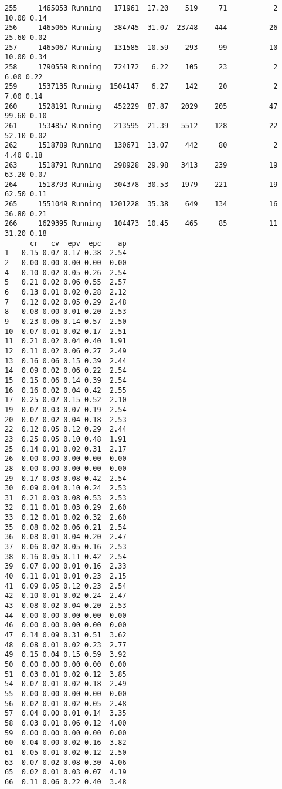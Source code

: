 \documentclass[
]{article}
\begin{document}
\begin{verbatim}
255     1465053 Running   171961  17.20    519     71           2   10.00 0.14
256     1465065 Running   384745  31.07  23748    444          26   25.60 0.02
257     1465067 Running   131585  10.59    293     99          10   10.00 0.34
258     1790559 Running   724172   6.22    105     23           2    6.00 0.22
259     1537135 Running  1504147   6.27    142     20           2    7.00 0.14
260     1528191 Running   452229  87.87   2029    205          47   99.60 0.10
261     1534857 Running   213595  21.39   5512    128          22   52.10 0.02
262     1518789 Running   130671  13.07    442     80           2    4.40 0.18
263     1518791 Running   298928  29.98   3413    239          19   63.20 0.07
264     1518793 Running   304378  30.53   1979    221          19   62.50 0.11
265     1551049 Running  1201228  35.38    649    134          16   36.80 0.21
266     1629395 Running   104473  10.45    465     85          11   31.20 0.18
      cr   cv  epv  epc    ap
1   0.15 0.07 0.17 0.38  2.54
2   0.00 0.00 0.00 0.00  0.00
4   0.10 0.02 0.05 0.26  2.54
5   0.21 0.02 0.06 0.55  2.57
6   0.13 0.01 0.02 0.28  2.12
7   0.12 0.02 0.05 0.29  2.48
8   0.08 0.00 0.01 0.20  2.53
9   0.23 0.06 0.14 0.57  2.50
10  0.07 0.01 0.02 0.17  2.51
11  0.21 0.02 0.04 0.40  1.91
12  0.11 0.02 0.06 0.27  2.49
13  0.16 0.06 0.15 0.39  2.44
14  0.09 0.02 0.06 0.22  2.54
15  0.15 0.06 0.14 0.39  2.54
16  0.16 0.02 0.04 0.42  2.55
17  0.25 0.07 0.15 0.52  2.10
19  0.07 0.03 0.07 0.19  2.54
20  0.07 0.02 0.04 0.18  2.53
22  0.12 0.05 0.12 0.29  2.44
23  0.25 0.05 0.10 0.48  1.91
25  0.14 0.01 0.02 0.31  2.17
26  0.00 0.00 0.00 0.00  0.00
28  0.00 0.00 0.00 0.00  0.00
29  0.17 0.03 0.08 0.42  2.54
30  0.09 0.04 0.10 0.24  2.53
31  0.21 0.03 0.08 0.53  2.53
32  0.11 0.01 0.03 0.29  2.60
33  0.12 0.01 0.02 0.32  2.60
35  0.08 0.02 0.06 0.21  2.54
36  0.08 0.01 0.04 0.20  2.47
37  0.06 0.02 0.05 0.16  2.53
38  0.16 0.05 0.11 0.42  2.54
39  0.07 0.00 0.01 0.16  2.33
40  0.11 0.01 0.01 0.23  2.15
41  0.09 0.05 0.12 0.23  2.54
42  0.10 0.01 0.02 0.24  2.47
43  0.08 0.02 0.04 0.20  2.53
44  0.00 0.00 0.00 0.00  0.00
46  0.00 0.00 0.00 0.00  0.00
47  0.14 0.09 0.31 0.51  3.62
48  0.08 0.01 0.02 0.23  2.77
49  0.15 0.04 0.15 0.59  3.92
50  0.00 0.00 0.00 0.00  0.00
51  0.03 0.01 0.02 0.12  3.85
54  0.07 0.01 0.02 0.18  2.49
55  0.00 0.00 0.00 0.00  0.00
56  0.02 0.01 0.02 0.05  2.48
57  0.04 0.00 0.01 0.14  3.35
58  0.03 0.01 0.06 0.12  4.00
59  0.00 0.00 0.00 0.00  0.00
60  0.04 0.00 0.02 0.16  3.82
61  0.05 0.01 0.02 0.12  2.50
63  0.07 0.02 0.08 0.30  4.06
65  0.02 0.01 0.03 0.07  4.19
66  0.11 0.06 0.22 0.40  3.48

\end{verbatim}
\end{document}
